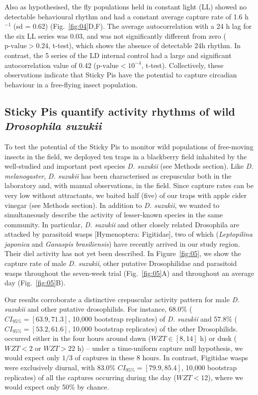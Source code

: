 \documentclass[12pt]{article}
\begin{document}
\begin{linenumbers}
		Also as hypothesised, the fly populations held in constant light (LL) showed no detectable behavioural rhythm and had a constant average capture rate of 1.6 h$^{-1}$ (sd = 0.62) (Fig.~\ref{fig:04}D,F).
		The average autocorrelation with a 24 h lag for the six LL series was 0.03, and was not significantly different from zero ($\text{p-value} > 0.24$,  t-test), which shows the absence of detectable 24h rhythm.
		In contrast, the 5 series of the LD internal control had a large and significant autocorrelation value of 0.42 ($\text{p-value} < 10^{-4}$, t-test).
		Collectively, these observations indicate that Sticky Pis have the potential to capture circadian behaviour in a free-flying insect population.

		\subsection*{Sticky Pis quantify activity rhythms of wild \emph{Drosophila suzukii}}

		To test the potential of the Sticky Pis to monitor wild populations of free-moving insects in the field, we deployed ten traps in a blackberry field inhabited by the well-studied and important pest species \emph{D. suzukii} (see Methods section). Like \emph{D. melanogaster}, \emph{D. suzukii} has been characterised as crepuscular both in the laboratory\cite{shaw_control_2019} and, with manual observations, in the field\cite{swoboda-bhattarai_diurnal_2020}. Since capture rates can be very low without attractants\cite{swoboda-bhattarai_diurnal_2020}, we baited half (five) of our traps with apple cider vinegar (see Methods section). In addition to \emph{D. suzukii}, we wanted to simultaneously describe the activity of lesser-known species in the same community. In particular, \emph{D. suzukii} and other closely related Drosophila are attacked by parasitoid wasps [Hymenoptera: Figitidae], two of which (\emph{Leptopilina japonica} and \emph{Ganaspis brasiliensis}) have recently arrived in our study region\cite{abram_new_2020}. Their diel activity has not yet been described. In Figure~\ref{fig:05}, we show the capture rate of male \emph{D. suzukii}, other putative Drosophilidae and parasitoid wasps throughout the seven-week trial (Fig.~\ref{fig:05}A) and throughout an average day (Fig.~\ref{fig:05}B). 

		Our results corroborate a distinctive crepuscular activity pattern for male \emph{D. suzukii} and other putative drosophilids.
		For instance, 68.0\% ($CI_{95\%} =  [63.9, 71.3]$, 10,000 bootstrap replicates) of \emph{D. suzukii} and 
		57.8\% ($CI_{95\%} =  [53.2, 61.6]$, 10,000 bootstrap replicates) of the other Drosophilids.
		 occurred either in the four hours around dawn ($WZT \in [8, 14]$ h) or dusk ($WZT < 2$ or $WZT > 22$ h) -- under a time-uniform capture null hypothesis, we would expect only $1/3$ of captures in these 8 hours.
		In contrast, Figitidae wasps were exclusively diurnal, with 83.0\% $CI_{95\%} =  [79.9, 85.4]$, 10,000 bootstrap replicates) of all the captures occurring during the day ($WZT < 12$), where we would expect only 50\% by chance.		


\end{linenumbers}
\end{document}
